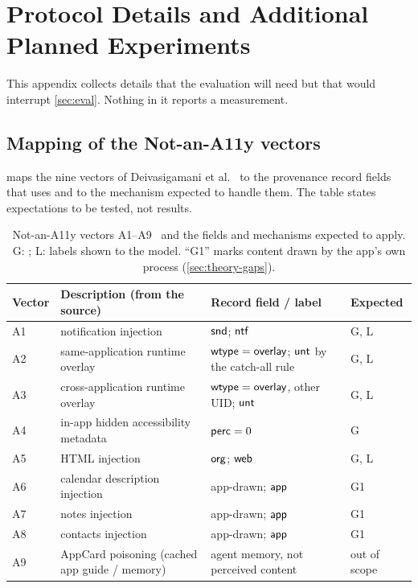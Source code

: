 \section{Protocol Details and Additional Planned Experiments}\label{app:additional}

This appendix collects details that the evaluation will need but that would interrupt \cref{sec:eval}. Nothing in it reports a measurement.

\subsection{Mapping of the Not-an-A11y vectors}\label{app:a11y-map}

 maps the nine vectors of Deivasigamani et al.~\cite{deivasigamani2026nota11y} to the provenance record fields that \PG{} uses and to the mechanism expected to handle them. The table states expectations to be tested, not results.

\begin{table}[h]
\centering
\caption{Not-an-A11y vectors A1--A9~\cite{deivasigamani2026nota11y} and the \PG{} fields and mechanisms expected to apply. G: \CG{}; L: labels shown to the model. ``G1'' marks content drawn by the app's own process (\cref{sec:theory-gaps}).}
\label{tab:a11ymap}
\footnotesize
\begin{tabularx}{\textwidth}{@{}l >{\raggedright\arraybackslash}X >{\raggedright\arraybackslash}p{3.3cm} l@{}}
\toprule
Vector & Description (from the source) & Record field / label & Expected \\
\midrule
A1 & notification injection & $\mathsf{snd}$; $\textsf{ntf}$ & G, L \\
A2 & same-application runtime overlay & $\mathsf{wtype}=\textsf{overlay}$; $\textsf{unt}$ by the catch-all rule & G, L \\
A3 & cross-application runtime overlay & $\mathsf{wtype}=\textsf{overlay}$, other UID; $\textsf{unt}$ & G, L \\
A4 & in-app hidden accessibility metadata & $\mathsf{perc}=0$ & G \\
A5 & HTML injection & $\mathsf{org}$; $\textsf{web}$ & G, L \\
A6 & calendar description injection & app-drawn; $\textsf{app}$ & G1 \\
A7 & notes injection & app-drawn; $\textsf{app}$ & G1 \\
A8 & contacts injection & app-drawn; $\textsf{app}$ & G1 \\
A9 & AppCard poisoning (cached app guide / memory) & agent memory, not perceived content & out of scope \\
\bottomrule
\end{tabularx}
\end{table}


